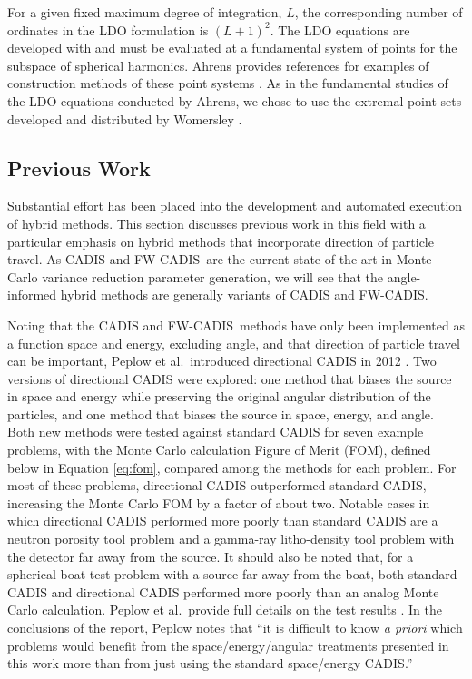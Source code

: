 \documentclass{article} %
\newcommand{\fwc}{\mbox{FW-CADIS}}
\begin{document}
For a given fixed maximum degree of integration, $L$, the corresponding number
of ordinates in the LDO formulation is $(L+1)^2$. The LDO equations are
developed with and must be evaluated at a fundamental system of points for the
subspace of spherical harmonics. Ahrens provides references for examples of
construction methods of these point systems \cite{ahrens}. As in the
fundamental studies of the LDO equations conducted by Ahrens, we chose to use
the extremal point sets developed and distributed by Womersley \cite{wom}.

\subsection{Previous Work}

Substantial effort has been placed into the development and automated
execution of hybrid methods. This section discusses previous work in this
field with a particular emphasis on hybrid methods that incorporate
direction of particle travel. As CADIS and \fwc\ are the current state of the
art in Monte Carlo variance reduction parameter generation, we will see that
the angle-informed hybrid methods are generally variants of CADIS and \fwc.

Noting that the CADIS and \fwc\ methods have only been implemented as a
function space and energy, excluding angle, and that direction of particle
travel can be important, Peplow et al.\ introduced directional CADIS in 2012
\cite{peplow}. Two versions of directional CADIS were explored: one method
that biases the source in space and energy while preserving the original
angular distribution of the particles, and one method that biases the source
in space, energy, and angle. Both new methods were tested against standard
CADIS for seven example problems, with the Monte Carlo calculation Figure of
Merit (FOM), defined below in Equation \eqref{eq:fom}, compared among the
methods for each problem. For most of these problems, directional CADIS
outperformed standard CADIS, increasing the Monte Carlo FOM by a factor of
about two. Notable cases in which directional CADIS performed more poorly than
standard CADIS are a neutron porosity tool problem and a gamma-ray litho-density
 tool problem with the detector far away from the source. It should
also be noted that, for a spherical boat test problem with a source far away
from the boat, both standard CADIS and directional CADIS performed more poorly
than an analog Monte Carlo calculation. Peplow et al.\ provide full details on
the test results \cite{peplow}. In the conclusions of the
report, Peplow notes that ``it is difficult to know \textit{a priori} which
problems would benefit from the space/energy/angular treatments presented in
this work more than from just using the standard space/energy CADIS.''
\end{document}
